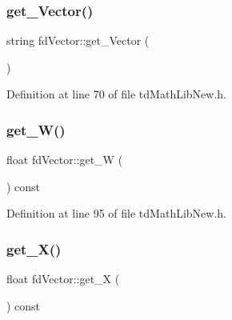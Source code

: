 \hypertarget{classfd_vector_adceaf088e11b897bcd45dbb405b50c71}{}\label{classfd_vector_adceaf088e11b897bcd45dbb405b50c71} 
\subsubsection{\texorpdfstring{get\+\_\+\+Vector()}{get\_Vector()}}
{\footnotesize\ttfamily string fd\+Vector\+::get\+\_\+\+Vector (\begin{DoxyParamCaption}{ }\end{DoxyParamCaption})\hspace{0.3cm}{\ttfamily [inline]}}



Definition at line 70 of file td\+Math\+Lib\+New.\+h.

\hypertarget{classfd_vector_a485db25930d37bead80a7e655b7b5767}{}\label{classfd_vector_a485db25930d37bead80a7e655b7b5767} 
\subsubsection{\texorpdfstring{get\+\_\+\+W()}{get\_W()}}
{\footnotesize\ttfamily float fd\+Vector\+::get\+\_\+W (\begin{DoxyParamCaption}{ }\end{DoxyParamCaption}) const\hspace{0.3cm}{\ttfamily [inline]}}



Definition at line 95 of file td\+Math\+Lib\+New.\+h.

\hypertarget{classfd_vector_ad1cd812db0a8076ec4fa135d12695e96}{}\label{classfd_vector_ad1cd812db0a8076ec4fa135d12695e96} 
\subsubsection{\texorpdfstring{get\+\_\+\+X()}{get\_X()}}
{\footnotesize\ttfamily float fd\+Vector\+::get\+\_\+X (\begin{DoxyParamCaption}{ }\end{DoxyParamCaption}) const\hspace{0.3cm}{\ttfamily [inline]}}



